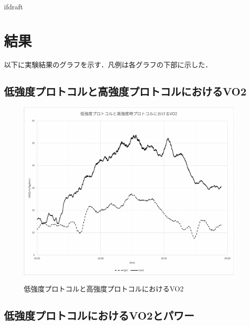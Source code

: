 \expandafter\ifx\csname ifdraft\endcsname\relax
 
\fi

\section{結果}

以下に実験結果のグラフを示す．凡例は各グラフの下部に示した．

\subsection{低強度プロトコルと高強度プロトコルにおけるVO2}

\begin{figure}[H]
  \begin{center}
    \label{fig:light_hard_vo2}
    \includegraphics[width=12cm]{fig/light_hard_vo2}
    \caption{低強度プロトコルと高強度プロトコルにおけるVO2}
  \end{center}
\end{figure}

\subsection{低強度プロトコルにおけるVO2とパワー}

